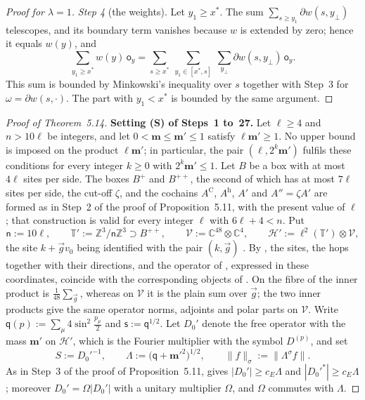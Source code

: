 \documentclass[11pt]{amsart}
\theoremstyle{definition}
\begin{document}
\begin{proof}[Proof for $\lambda=1$]
\emph{Step 4} (the weights).
Let $y_1\ge x^*$.
The sum $\sum_{s\ge y_1}\partial w(s,y_\perp)$ telescopes, and its boundary term vanishes because $w$ is extended by zero;
hence it equals $w(y)$, and
\begin{equation*}
\sum_{y_1\ge x^*}w(y)\,\mathsf o_y=\sum_{s\ge x^*}\ \sum_{y_1\in[x^*,s]}\ \sum_{y_\perp}\partial w(s,y_\perp)\,\mathsf o_y.
\end{equation*}
This sum is bounded by Minkowski's inequality over $s$ together with Step~3 for $\omega=\partial w(s,\cdot)$.
The part with $y_1<x^*$ is bounded by the same argument.
\end{proof}

\begin{proof}[Proof of Theorem~5.14]
\textbf{Setting (S) of Steps~1 to~27.}
Let $\ell\ge4$ and $n>10\ell$ be integers, and let $0<\mathbf m\le\mathbf m'\le1$ satisfy $\ell\mathbf m'\ge1$.
No upper bound is imposed on the product $\ell\mathbf m'$;
in particular, the pair $(\ell,2^k\mathbf m')$ fulfils these conditions for every integer $k\ge0$ with $2^k\mathbf m'\le1$.
Let $B$ be a box with at most $4\ell$ sites per side.
The boxes $B^+$ and $B^{++}$, the second of which has at most $7\ell$ sites per side, the cut-off $\zeta$, and the cochains $A^{\mathrm C}$, $A^{\mathrm h}$, $A'$ and $A''=\zeta A'$ are formed as in Step~2 of the proof of Proposition~5.11, with the present value of $\ell$;
that construction is valid for every integer $\ell$ with $6\ell+4<n$.
Put
\begin{equation*}
\mathsf n:=10\ell,\qquad\mathbb T':=\mathbb Z^3/\mathsf n\mathbb Z^3\supset B^{++},\qquad\mathcal V:=\mathbb C^{48}\otimes\mathbb C^4,\qquad\mathcal H':=\ell^2(\mathbb T')\otimes\mathcal V,
\end{equation*}
the site $k+\vec gv_0$ being identified with the pair $(k,\vec g)$ \cite[Definition~2.10]{QEDII}.
By \cite[Proposition~46\,(a), (b)]{QEDIII}, the sites, the hops together with their directions, and the operator of \cite{QEDIII}, expressed in these coordinates, coincide with the corresponding objects of \cite{QEDII}.
On the fibre of \cite{QEDIII} the inner product is $\frac1{48}\sum_{\vec g}$, whereas on $\mathcal V$ it is the plain sum over $\vec g$;
the two inner products give the same operator norms, adjoints and polar parts on $\mathcal V$.
Write $\mathsf q(p):=\sum_\mu4\sin^2\frac{p_\mu}{2}$ and $\mathsf s:=\mathsf q^{1/2}$.
Let $D_0'$ denote the free operator with the mass $\mathbf m'$ on $\mathcal H'$, which is the Fourier multiplier with the symbol $D^{(p)}$, and set
\begin{equation*}
S:=D_0'^{-1},\qquad\Lambda:=\bigl(\mathsf q+\mathbf m'^2\bigr)^{1/2},\qquad\|f\|_\sigma:=\|\Lambda^\sigma f\|.
\end{equation*}
As in Step~3 of the proof of Proposition~5.11, \cite[Proposition~37.1\,(f)]{QEDIII} gives $|D_0'|\ge c_E\Lambda$ and $|D_0'^*|\ge c_E\Lambda$;
moreover $D_0'=\Omega|D_0'|$ with a unitary multiplier $\Omega$, and $\Omega$ commutes with $\Lambda$.


\end{proof}
\end{document}
